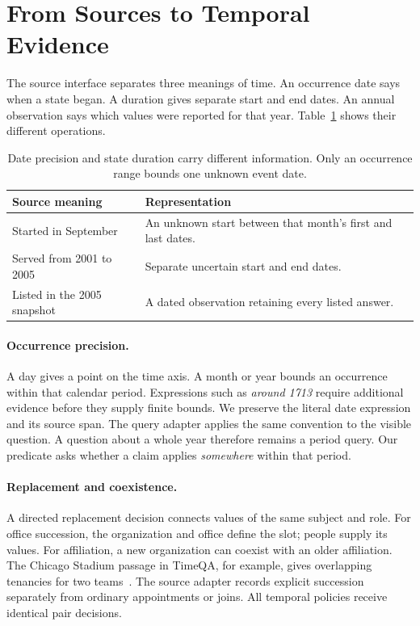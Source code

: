 \section{From Sources to Temporal Evidence}
\label{sec:sources}

The source interface separates three meanings of time.
An occurrence date says when a state began.
A duration gives separate start and end dates.
An annual observation says which values were reported for that year.
Table~\ref{tab:date-types} shows their different operations.

\begin{table}[b]
\centering\small
\begin{tabular}{@{}p{}p{}@{}}
\toprule
Source meaning & Representation\\
\midrule
Started in September & An unknown start between that month's first and last dates.\\[3pt]
Served from 2001 to 2005 & Separate uncertain start and end dates.\\[3pt]
Listed in the 2005 snapshot & A dated observation retaining every listed answer.\\
\bottomrule
\end{tabular}
\caption{Date precision and state duration carry different information. Only an occurrence range bounds one unknown event date.}
\label{tab:date-types}
\end{table}

\paragraph{Occurrence precision.}
A day gives a point on the time axis.
A month or year bounds an occurrence within that calendar period.
Expressions such as \emph{around 1713} require additional evidence before they supply finite bounds.
We preserve the literal date expression and its source span.
The query adapter applies the same convention to the visible question.
A question about a whole year therefore remains a period query.
Our predicate asks whether a claim applies \emph{somewhere} within that period.

\paragraph{Replacement and coexistence.}
A directed replacement decision connects values of the same subject and role.
For office succession, the organization and office define the slot; people supply its values.
For affiliation, a new organization can coexist with an older affiliation.
The Chicago Stadium passage in TimeQA, for example, gives overlapping tenancies for two teams~\citep{chen2021timeqa}.
The source adapter records explicit succession separately from ordinary appointments or joins.
All temporal policies receive identical pair decisions.

